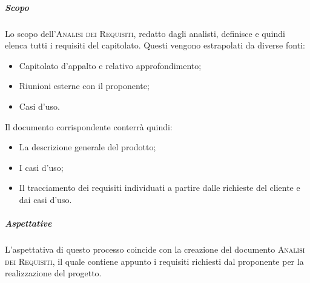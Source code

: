 \documentclass[../norme-di-progetto.tex]{subfiles}
\begin{document}
\subparagraph{Scopo}
Lo scopo dell'\textsc{Analisi dei Requisiti}, redatto dagli analisti, definisce e quindi elenca tutti i requisiti del capitolato. Questi vengono estrapolati da diverse fonti:
\begin{itemize}
  \item Capitolato d'appalto e relativo approfondimento;
  \item Riunioni esterne con il proponente;
  \item Casi d'uso.
\end{itemize}
Il documento corrispondente conterrà quindi:
\begin{itemize}
  \item La descrizione generale del prodotto;
  \item I casi d'uso;
  \item Il tracciamento dei requisiti individuati a partire dalle richieste del cliente e dai casi d'uso.
\end{itemize}

\subparagraph{Aspettative}
L'aspettativa di questo processo coincide con la creazione del documento \textsc{Analisi dei Requisiti}, il quale contiene appunto i requisiti richiesti dal proponente per la realizzazione del progetto.
\end{document}
